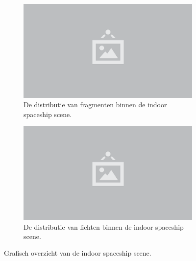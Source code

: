 \begin{figure}[p]
\begin{subfigure}[b]{.33\textwidth}
  \end{subfigure} %
  \begin{subfigure}[b]{.33\textwidth}
    \centering\includegraphics[width=\textwidth]{./img/raw/placeholder.png}
    \caption{De distributie van fragmenten binnen de indoor spaceship scene.}\label{fig:test-suite-spaceship:fragments}
  \end{subfigure}%
  \begin{subfigure}[b]{.33\textwidth}
    \centering\includegraphics[width=\textwidth]{./img/raw/placeholder.png}
    \caption{De distributie van lichten binnen de indoor spaceship scene.}\label{fig:test-suite-spaceship:lights}
  \end{subfigure}%
  \caption{Grafisch overzicht van de indoor spaceship scene.}
  \label{fig:test-suite-spaceship-images}
\end{figure}
